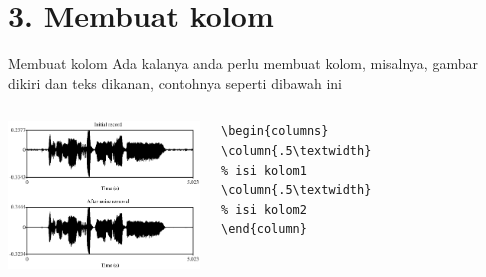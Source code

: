 \documentclass{beamer}
\begin{document}
\section{3. Membuat kolom}
\begin{frame}[t, fragile] {Membuat kolom}
Ada kalanya anda perlu membuat kolom, misalnya, gambar dikiri dan teks dikanan, contohnya seperti dibawah ini \\
\begin{columns}
\includegraphics[width=2in]{pict/praat.eps}
\begin{verbatim}
\begin{columns}
\column{.5\textwidth}
% isi kolom1
\column{.5\textwidth}
% isi kolom2
\end{column}
\end{verbatim}
\end{columns}
\end{frame}
\end{document}
